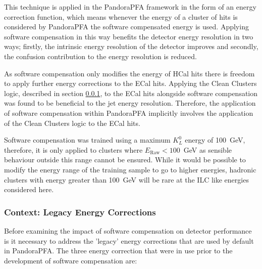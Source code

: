 This technique is applied in the PandoraPFA framework in the form of an energy correction function, which means whenever the energy of a cluster of hits is considered by PandoraPFA the software compensated energy is used.  Applying software compensation in this way benefits the detector energy resolution in two ways; firstly, the intrinsic energy resolution of the detector improves and secondly, the confusion contribution to the energy resolution is reduced.

As software compensation only modifies the energy of HCal hits there is freedom to apply further energy corrections to the ECal hits.  Applying the Clean Clusters logic, described in section \ref{sec:legacycorrections}, to the ECal hits alongside software compensation was found to be beneficial to the jet energy resolution.  Therefore, the application of software compensation within PandoraPFA implicitly involves the application of the Clean Clusters logic to the ECal hits.  

Software compensation was trained using a maximum $K^{0}_{L}$ energy of 100~GeV, therefore, it is only applied to clusters where $E_{\text{Raw}} < 100$~GeV as sensible behaviour outside this range cannot be ensured.  While it would be possible to modify the energy range of the training sample to go to higher energies, hadronic clusters with energy greater than 100~GeV will be rare at the ILC like energies considered here.


\subsubsection{Context: Legacy Energy Corrections}
\label{sec:legacycorrections}
Before examining the impact of software compensation on detector performance is it necessary to address the 'legacy' energy corrections that are used by default in PandoraPFA.  The three energy correction that were in use prior to the development of software compensation are:

